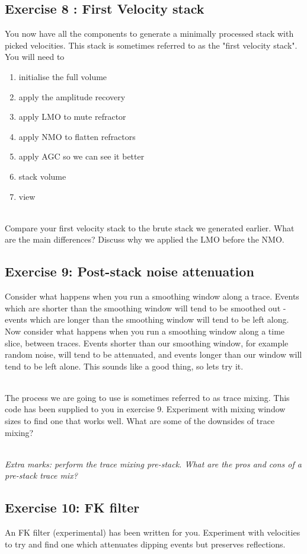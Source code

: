 \subsection*{Exercise 8 : First Velocity stack}
You now have all the components to generate a minimally processed stack with picked velocities.  This stack is sometimes referred to as the "first velocity stack".  You will need to
\begin{enumerate}
\item initialise the full volume
\item apply the amplitude recovery
\item apply LMO to mute refractor
\item apply NMO to flatten refractors
\item apply AGC so we can see it better
\item stack volume
\item view
\end{enumerate}
\par~\\
Compare your first velocity stack to the brute stack we generated earlier. What are the main differences?  Discuss why we applied the LMO before the NMO.

\subsection*{Exercise 9: Post-stack noise attenuation}
Consider what happens when you run a smoothing window along a trace.  Events which are shorter than the smoothing window will tend to be smoothed out - events which are longer than the smoothing window will tend to be left along. Now consider what happens when you run a smoothing window along a time slice, between traces.  Events shorter than our smoothing window, for example random noise, will tend to be attenuated, and events longer than our window will tend to be left alone. This sounds like a good thing, so lets try it.
\par~\\
The process we are going to use is sometimes referred to as trace mixing. This code has been supplied to you in exercise 9. Experiment with mixing window sizes to find one that works well.  What are some of the downsides of trace mixing?
\par~\\
\emph{Extra marks: perform the trace mixing pre-stack.  What are the pros and cons of a pre-stack trace mix?}

\subsection*{Exercise 10: FK filter}
An FK filter (experimental) has been written for you. Experiment with velocities to try and find one which attenuates dipping events but preserves reflections.

